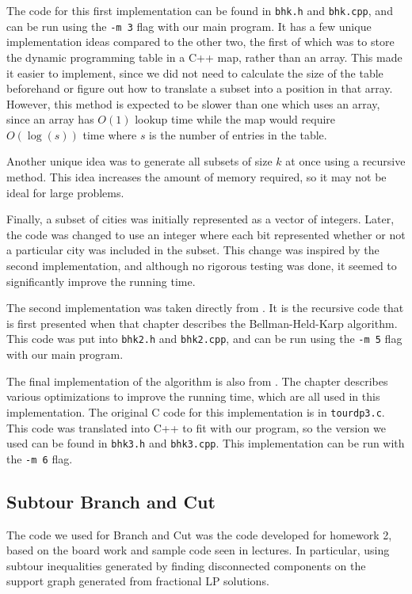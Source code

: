 \documentclass[11pt]{article}
\begin{document}
	The code for this first implementation can be found in \texttt{bhk.h} and \texttt{bhk.cpp}, and can be run using the \texttt{-m 3} flag with our main program. It has a few unique implementation ideas compared to the other two, the first of which was to store the dynamic programming table in a C++ map, rather than an array. This made it easier to implement, since we did not need to calculate the size of the table beforehand or figure out how to translate a subset into a position in that array. However, this method is expected to be slower than one which uses an array, since an array has $O(1)$ lookup time while the map would require $O(\log(s))$ time where $s$ is the number of entries in the table.
	
	Another unique idea was to generate all subsets of size $k$ at once using a recursive method. This idea increases the amount of memory required, so it may not be ideal for large problems.
	
	Finally, a subset of cities was initially represented as a vector of integers. Later, the code was changed to use an integer where each bit represented whether or not a particular city was included in the subset. This change was inspired by the second implementation, and although no rigorous testing was done, it seemed to significantly improve the running time.
	
	The second implementation was taken directly from \cite{bico}. It is the recursive code that is first presented when that chapter describes the Bellman-Held-Karp algorithm. This code was put into \texttt{bhk2.h} and \texttt{bhk2.cpp}, and can be run using the \texttt{-m 5} flag with our main program.
	
	The final implementation of the algorithm is also from \cite{bico}. The chapter describes various optimizations to improve the running time, which are all used in this implementation. The original C code for this implementation is in \texttt{tour{\textunderscore}dp3.c}. This code was translated into C++ to fit with our program, so the version we used can be found in \texttt{bhk3.h} and \texttt{bhk3.cpp}. This implementation can be run with the \texttt{-m 6} flag.
	
	\subsection{Subtour Branch and Cut}
	
	The code we used for Branch and Cut was the code developed for homework 2, based on the board work and sample code seen in lectures. In particular, using subtour inequalities generated by finding disconnected components on the support graph generated from fractional LP solutions.
	
\end{document}
